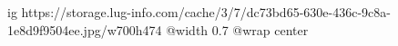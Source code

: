  
 
 
 
 

\ifcmt
  ig https://storage.lug-info.com/cache/3/7/dc73bd65-630e-436c-9c8a-1e8d9f9504ee.jpg/w700h474
  @width 0.7
  @wrap center
\fi
